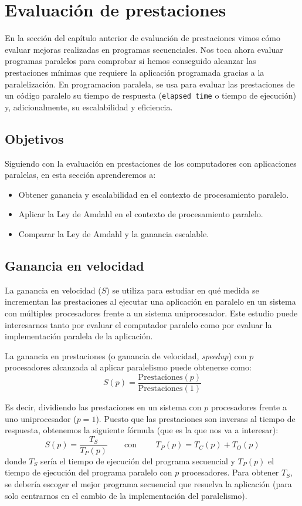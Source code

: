 \newpage
\section{Evaluación de prestaciones}
En la sección del capítulo anterior de evaluación de prestaciones vimos cómo evaluar mejoras realizadas en programas secuenciales. Nos toca ahora evaluar programas paralelos para comprobar si hemos conseguido alcanzar las prestaciones mínimas que requiere la aplicación programada gracias a la paralelización. En programacion paralela, se usa para evaluar las prestaciones de un código paralelo su tiempo de respuesta (\verb|elapsed time| o tiempo de ejecución) y, adicionalmente, su escalabilidad y eficiencia.

\subsection{Objetivos}
Siguiendo con la evaluación en prestaciones de los computadores con aplicaciones paralelas, en esta sección aprenderemos a:
\begin{itemize}
    \item Obtener ganancia y escalabilidad en el contexto de procesamiento paralelo.
    \item Aplicar la Ley de Amdahl en el contexto de procesamiento paralelo.
    \item Comparar la Ley de Amdahl y la ganancia escalable.
\end{itemize}

\subsection{Ganancia en velocidad}
La ganancia en velocidad ($S$) se utiliza para estudiar en qué medida se incrementan las prestaciones al ejecutar una aplicación en paralelo en un sistema con múltiples procesadores frente a un sistema uniprocesador. Este estudio puede interesarnos tanto por evaluar el computador paralelo como por evaluar la implementación paralela de la aplicación.

La ganancia en prestaciones (o ganancia de velocidad, \emph{speedup}) con $p$ procesadores alcanzada al aplicar paralelismo puede obtenerse como:
\begin{equation*}
    S(p) = \dfrac{\text{Prestaciones}(p)}{\text{Prestaciones}(1)}
\end{equation*}

Es decir, dividiendo las prestaciones en un sistema con $p$ procesadores frente a uno uniprocesador ($p=1$). Puesto que las prestaciones son inversas al tiempo de respuesta, obtenemos la siguiente fórmula (que es la que nos va a interesar):
\begin{equation}
    S(p) = \dfrac{T_S}{T_P(p)}\qquad \text{con\ }\qquad  T_P(p) = T_C(p) + T_O(p)
\end{equation}
donde $T_S$ sería el tiempo de ejecución del programa secuencial y $T_P(p)$ el tiempo de ejecución del programa paralelo con $p$ procesadores. Para obtener $T_S$, se debería escoger el mejor programa secuencial que resuelva la aplicación (para solo centrarnos en el cambio de la implementación del paralelismo).

